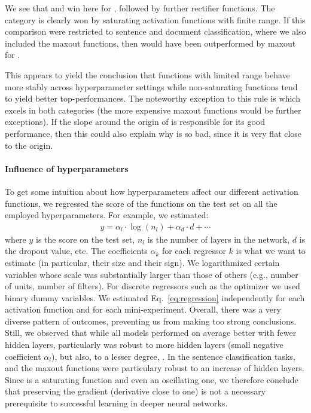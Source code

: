 We see that \pentan{} and \swish{} win here for \best, followed by further rectifier functions. The \avg{} category is clearly won by saturating activation functions with finite range. If this comparison were restricted to sentence and document classification, where we also included the maxout functions, then \pentan{} would have been outperformed by maxout for \avg{}.

This appears to yield the conclusion that functions with limited range behave more stably across hyperparameter settings while non-saturating functions tend to yield better top-performances. The noteworthy exception to this rule is \pentan{} which excels in both categories (the more expensive maxout functions would be further exceptions). If the slope around the origin of \pentan{} is responsible for its good performance, then this could also explain why \cube{} is so bad, since it is very flat close to the origin.  

\paragraph{Influence of hyperparameters} To get some intuition about how hyperparameters affect our different activation functions, we regressed the score of the functions on the test set on all the employed hyperparameters. For example, we estimated:
\begin{align}\label{eq:regression}
  y = \alpha_l\cdot\log(n_l)+\alpha_d\cdot d+\cdots
\end{align}
where $y$ is the score on the test set, $n_l$ is the number of layers in the network, $d$ is the dropout value, etc. The coefficients $\alpha_k$ for each regressor $k$ is what we want to estimate (in particular, their size and their sign). We logarithmized certain variables whose scale was substantially larger than those of others (e.g., number of units, number of filters). For discrete regressors such as the optimizer we used binary dummy variables. We estimated Eq.~\eqref{eq:regression} independently for each activation function and for each mini-experiment. Overall, there was a very diverse pattern of outcomes, preventing us from making too strong conclusions. Still, we observed that while all models performed on average better with fewer hidden layers, particularly \swish{} was robust to more hidden layers (small negative coefficient $\alpha_l$), but also, to a lesser degree, \pentan{}. In the sentence classification tasks, \mysin{} and the maxout functions were particulary robust to an increase of hidden layers. Since \pentan{} is a saturating function and \mysin{} even an oscillating one, we therefore conclude that preserving the gradient (derivative close to one) is not a necessary prerequisite to successful learning in deeper neural networks. 

